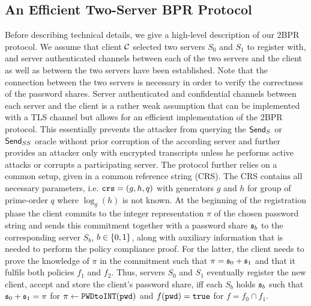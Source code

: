 \subsection{An Efficient Two-Server BPR Protocol}\label{sec:framework}
Before describing technical details, we give a high-level description of our 2BPR protocol.
We assume that client $\mathcal{C}$ selected two servers $S_0$ and $S_1$ to register with, and server authenticated channels between each of the two servers and the client as well as between the two servers have been established.
Note that the connection between the two servers is necessary in order to verify the correctness of the password shares.
Server authenticated and confidential channels between each server and the client is a rather weak assumption that can be implemented with a TLS channel \cite{rfc5246,JagerKSS12,KrawczykPW13} but allows for an efficient implementation of the 2BPR protocol.
This essentially prevents the attacker from querying the $\mathsf{Send}_S$ or $\mathsf{Send}_{SS}$ oracle without prior corruption of the according server and further provides an attacker only with encrypted transcripts unless he performs active attacks or corrupts a participating server.
The protocol further relies on a common setup, given in a common reference string (CRS).
The CRS contains all necessary parameters, i.e. $\mathtt{crs}=(g, h, q)$ with generators $g$ and $h$ for group of prime-order $q$ where $\log_g(h)$ is not known.
At the beginning of the registration phase the client commits to the integer representation $\pi$ of the chosen password string \pwd and sends this commitment together with a password share $\mathfrak{s}_b$ to the corresponding server $S_b$, $b\in\{0,1\}$, along with auxiliary information that is needed to perform the policy compliance proof.
For the latter, the client needs to prove the knowledge of $\pi$ in the commitment such that $\pi = \mathfrak{s}_0 + \mathfrak{s}_1$ and that it fulfils both policies $f_1$ and $f_2$.
Thus, servers $S_0$ and $S_1$ eventually register the new client, accept and store the client's password share, iff each $S_b$ holds $\mathfrak{s}_b$ such that $\mathfrak{s}_0+\mathfrak{s}_1=\pi$ for $\pi\gets\texttt{PWDtoINT}(\mathtt{pwd})$ and $f(\mathtt{pwd})=\mathtt{true}$ for $f=f_0\cap f_1$.


